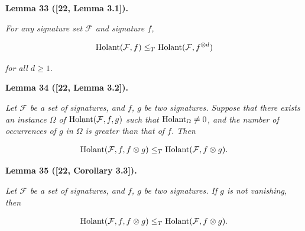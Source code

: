 

\par\medskip\noindent\textbf{
\textbf{Lemma 33}\textbf{ }([22, Lemma 3.1])\textbf{.}
}\par



\emph{For any signature set $\mathcal{F}$ and signature $f$,}\par


\[\begin{gathered}
\textup{{Holant}}(\mathcal{F},f)\leq_{T}\textup{{Holant}}(\mathcal{F},f^{\otimes d})
\end{gathered}\]


\emph{for all $d\geq 1$.}\par







\par\medskip\noindent\textbf{
\textbf{Lemma 34}\textbf{ }([22, Lemma 3.2])\textbf{.}
}\par



\emph{Let $\mathcal{F}$ be a set of signatures, and $f$, $g$ be two signatures. Suppose that
there exists an instance $\Omega$ of $\textup{{Holant}}(\mathcal{F},f,g)$ such that $\textup{{Holant}}_{\Omega}\neq 0$, and the number
of occurrences of $g$ in $\Omega$ is greater than that of $f$. Then}\par


\[\begin{gathered}
\textup{{Holant}}(\mathcal{F},f,f\otimes g)\leq_{T}\textup{{Holant}}(\mathcal{F},f\otimes g).
\end{gathered}\]







\par\medskip\noindent\textbf{
\textbf{Lemma 35}\textbf{ }([22, Corollary 3.3])\textbf{.}
}\par



\emph{Let $\mathcal{F}$ be a set of signatures, and $f$, $g$ be two signatures. If $g$ is
not vanishing, then}\par


\[\begin{gathered}
\textup{{Holant}}(\mathcal{F},f,f\otimes g)\leq_{T}\textup{{Holant}}(\mathcal{F},f\otimes g).
\end{gathered}\]



